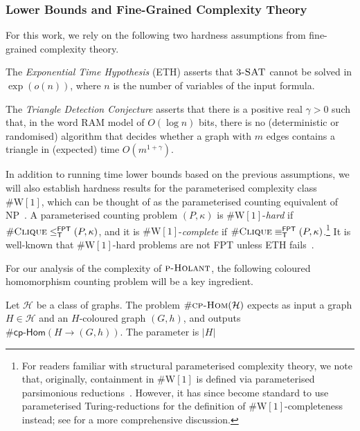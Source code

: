 \documentclass[authorcolumns,numberwithinsect]{no-lipics-v2022}
\newcommand{\W}{\mathrm{W}}
\newcommand{\cphomsprob}{\text{\sc{cp-Hom}}}
\newcommand{\fptred}{\leq^{\mathsf{FPT}}_{\mathsf{T}}}
\newcommand{\fptinterred}{\equiv^{\mathsf{FPT}}_{\mathsf{T}}}
\newcommand{\holantprob}{\text{\sc{p-Holant}}}
\newcommand{\cphoms}{\mathsf{cp}\text{-}\mathsf{Hom}}
\begin{document}
\subsubsection{Lower Bounds and Fine-Grained Complexity Theory}\label{sec:prelims_fgct}
For this work, we rely on the following two hardness assumptions from fine-grained complexity theory.

\begin{hypothesis}
    The \emph{Exponential Time Hypothesis} (ETH) asserts that $3\textsc{-SAT}$ cannot be solved in $\exp(o(n))$, where $n$ is the number of variables of the input formula. 
\end{hypothesis}

\begin{hypothesis}
    The \emph{Triangle Detection Conjecture} asserts that there is a positive real $\gamma >0$ such that, in the word RAM model of $O(\log n)$ bits, there is no (deterministic or randomised) algorithm that decides whether a graph with $m$ edges contains a triangle in (expected) time $O(m^{1+\gamma})$.
\end{hypothesis}

In addition to running time lower bounds based on the previous assumptions, we will also establish hardness results for the parameterised complexity class $\#\W[1]$, which can be thought of as the parameterised counting equivalent of $\mathrm{NP}$~\cite[Chapter 14]{FlumG06}. A parameterised counting problem $(P,\kappa)$ is $\#\W[1]$-\emph{hard} if $\#\textsc{Clique}\fptred (P,\kappa)$, and it is $\#\W[1]$-\emph{complete} if $\#\textsc{Clique}\fptinterred (P,\kappa)$.\footnote{For readers familiar with structural parameterised complexity theory, we note that, originally, containment in $\#\W[1]$ is defined via parameterised parsimonious reductions~\cite[Chapter 14]{FlumG06}. However, it has since become standard to use parameterised Turing-reductions for the definition of $\#\W[1]$-completeness instead; see \cite[Chapter 2.3.1]{Roth19} for a more comprehensive discussion.} It is well-known that $\#\W[1]$-hard problems are not FPT unless ETH fails~\cite{Chenetal05,Chenetal06,CyganFKLMPPS15}. 

For our analysis of the complexity of $\holantprob$, the following coloured homomorphism counting problem will be a key ingredient.

\begin{definition}[$\#\cphomsprob(\mathcal{H})$]
    Let $\mathcal{H}$ be a class of graphs. The problem $\#\cphomsprob(\mathcal{H})$ expects as input a graph $H\in \mathcal{H}$ and an $H$-coloured graph $(G,h)$, and outputs $\#\cphoms(H \to (G,h))$. The parameter is $|H|$
\end{definition}
\end{document}
